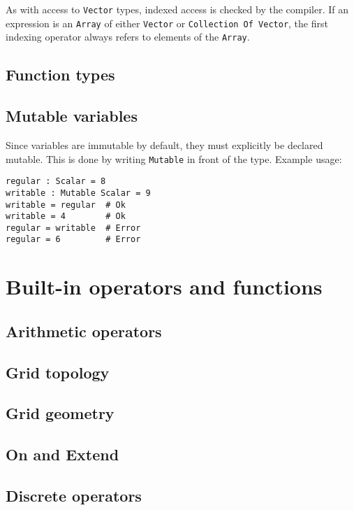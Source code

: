 \documentclass[11pt]{article}
\newcommand{\code}[1]{\texttt{#1}}
\begin{document}
As with access to \code{Vector} types, indexed access is checked by the compiler. If an
expression is an \code{Array} of either \code{Vector} or \code{Collection Of Vector}, the
first indexing operator always refers to elements of the \code{Array}.

\subsection{Function types}

\subsection{Mutable variables}

Since variables are immutable by default, they must explicitly be declared mutable. This
is done by writing \code{Mutable} in front of the type. Example usage:

\begin{verbatim}
regular : Scalar = 8
writable : Mutable Scalar = 9
writable = regular  # Ok
writable = 4        # Ok
regular = writable  # Error
regular = 6         # Error
\end{verbatim}


\section{Built-in operators and functions}

\subsection{Arithmetic operators}

\subsection{Grid topology}

\subsection{Grid geometry}

\subsection{On and Extend}
\label{subsec:on-extend}

\subsection{Discrete operators}
\end{document}
